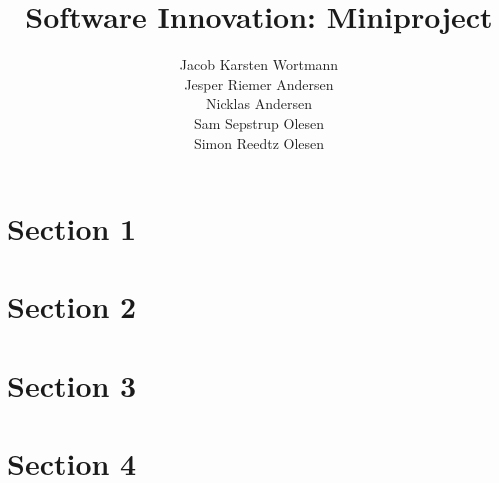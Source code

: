 \documentclass[a4paper,12pt]{memoir}
\title{Software Innovation: Miniproject}
\author{Jacob Karsten Wortmann\\Jesper Riemer Andersen\\Nicklas Andersen\\Sam Sepstrup Olesen\\Simon Reedtz Olesen}
\begin{document}
\maketitle

\section*{Section 1}

\section*{Section 2}



\section*{Section 3}


\section*{Section 4}
\end{document}
